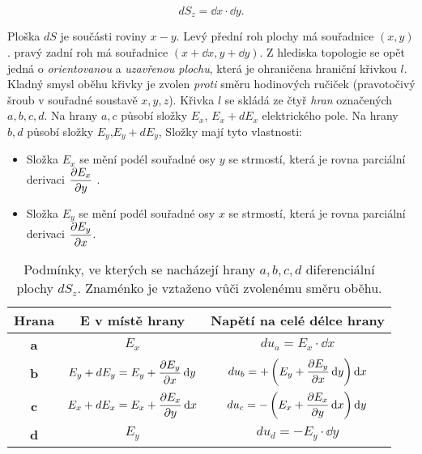         
        \begin{equation*}
          dS_z= \dd{x}\cdot \dd{y}.
        \end{equation*}
              
        Ploška \(dS\) je součásti roviny \(x-y\). Levý přední roh plochy má souřadnice \((x,y)\). 
        pravý zadní roh má souřadnice \((x+\dd{x}, y+\dd{y})\). Z hlediska topologie se opět jedná o 
        \emph{orientovanou} a \emph{uzavřenou plochu}, která je ohraničena hraniční křivkou \(l\). 
        Kladný smysl oběhu křivky je zvolen \emph{proti} směru hodinových ručiček (pravotočivý 
        šroub v souřadné soustavě \(x, y, z\)). Křivka \(l\) se skládá ze čtyř \emph{hran} 
        označených \(a, b, c, d\). Na hrany \(a, c\) působí složky \(E_x\), \(E_x+dE_x\) 
        elektrického pole. Na hrany 
        \(b, d\) působí složky \(E_y\),\(E_y + dE_y\), Složky mají tyto vlastnosti:
        \begin{itemize}[noitemsep]
          \item Složka \(E_x\) se mění podél souřadné osy \(y\) se strmostí, která je rovna 
                parciální derivaci \(\dfrac{\partial E_x}{\partial y}\) .
          \item Složka \(E_y\) se mění podél souřadné osy \(x\) se strmostí, která je rovna 
                parciální derivaci \(\dfrac{\partial E_y}{\partial x}\). 
        \end{itemize}
        
        \begin{table*}[ht!]
          \centering
          \begin{tabular}{|c|c|c|}
            \rowcolor[HTML]{FFFFC7}
            \hline Hrana      & E v místě hrany 
                              & Napětí na celé délce hrany                                     \\ 
            \hline \textbf{a} & \(E_x\)
                              & \(du_a=E_x\cdot \dd{x}\)                                           \\ 
            \hline \textbf{b} & \(E_y+dE_y = E_y + \dfrac{\partial E_y}{\partial x}\mathop{}\!\mathrm{d}y\) 
                              & \(du_b= +\left(E_y + \dfrac{\partial E_y}{\partial x}\mathop{}\!\mathrm{d}y\right)\mathop{}\!\mathrm{d}x\)                \\ 
            \hline \textbf{c} & \(E_x+dE_x = E_x + \dfrac{\partial E_x}{\partial y}\mathop{}\!\mathrm{d}x\)
                              & \(du_c= -\left(E_x + \dfrac{\partial E_x}{\partial y}\mathop{}\!\mathrm{d}x\right)\mathop{}\!\mathrm{d}y\)                \\ 
            \hline \textbf{d} & \(E_y\)                              
                              & \(du_d= - E_y\cdot \dd{y}\)                                        \\ 
            \hline 
          \end{tabular} 
          \caption{Podmínky, ve kterých se nacházejí hrany \(a, b, c, d\) diferenciální plochy 
                   \(dS_z\). Znaménko je vztaženo vůči zvolenému směru oběhu.}
          \label{es:tab_patocka_01}
        \end{table*}
        
